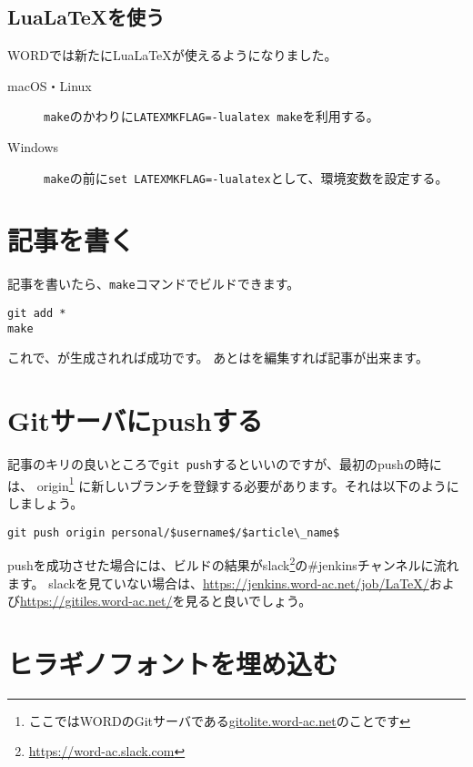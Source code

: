 \subsection{Lua\LaTeX を使う}

WORDでは新たにLua\LaTeX が使えるようになりました。

\begin{description}
  \item[macOS・Linux] \lstinline|make|のかわりに\lstinline|LATEXMKFLAG=-lualatex make|を利用する。
 
  \item[Windows] \lstinline|make|の前に\lstinline|set LATEXMKFLAG=-lualatex|として、環境変数を設定する。
\end{description}

\section{記事を書く}

記事を書いたら、\lstinline|make|コマンドでビルドできます。

\begin{lstlisting}
git add *
make
\end{lstlisting}

これで、が生成されれば成功です。
あとはを編集すれば記事が出来ます。

\section{Gitサーバにpushする}

記事のキリの良いところで\lstinline|git push|するといいのですが、最初のpushの時には、
origin\footnote{ここではWORDのGitサーバである\url{gitolite.word-ac.net}のことです}%
に新しいブランチを登録する必要があります。それは以下のようにしましょう。

\begin{lstlisting}[mathescape]
git push origin personal/$username$/$article\_name$
\end{lstlisting}

pushを成功させた場合には、ビルドの結果がslack\footnote{\url{https://word-ac.slack.com}}の\#jenkinsチャンネルに流れます。
slackを見ていない場合は、\url{https://jenkins.word-ac.net/job/LaTeX/}および\url{https://gitiles.word-ac.net/}を見ると良いでしょう。

\section{ヒラギノフォントを埋め込む}

